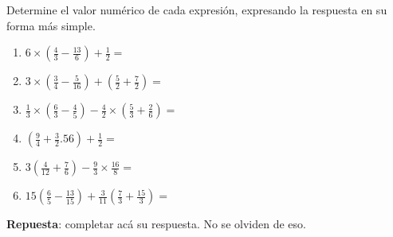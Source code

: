 \documentclass[11pt]{examdesign}
\theoremstyle{plain}
\theoremstyle{definition}
\theoremstyle{remark}
\begin{document}
    \begin{shortanswer}[title={\textit{Operaciones con fracciones.}},
    	rearrange=no,resetcounter=yes]
    	\begin{question}
    		Determine el valor numérico de cada expresión, expresando la respuesta en su forma más simple.
    		\begin{enumerate}
    			\item $6\times\left(\frac{4}{3}-\frac{13}{6}\right)+\frac{1}{2}=$
    			
    			\item $3\times\left(\frac{3}{4}-\frac{5}{16}\right)+\left(\frac{5}{2}+\frac{7}{2}\right)=$
    			
    			\item $\frac{1}{3}\times\left(\frac{6}{3}-\frac{4}{5}\right)-\frac{4}{2}\times\left(\frac{5}{3}+\frac{2}{6}\right)=$
    			
    			\item $\left(\frac{9}{4}+\frac{3}{2}.{5}{6}\right)+\frac{1}{2}=$
    			
    			\item $3\left(\frac{4}{12}+\frac{7}{6}\right)-\frac{9}{3}\times\frac{16}{8}=$
    			
    			\item $15\left(\frac{6}{5}-\frac{13}{15}\right)+\frac{3}{11}\left(\frac{7}{3}+\frac{15}{3}\right)=$
    		\end{enumerate}
    		
    		\begin{answer}
    			\textbf{Repuesta}: completar acá su respuesta. No se olviden de eso.
    		\end{answer}
    	\end{question}
    	
    \end{shortanswer}
\end{document}

